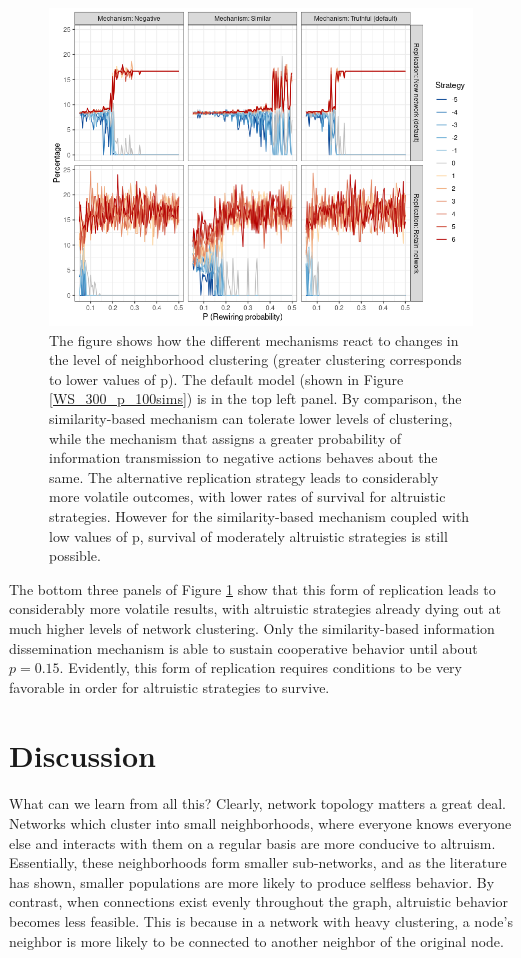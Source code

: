\documentclass{JASSS}
\begin{document}
\begin{figure}
	\centering
	\includegraphics[width=\linewidth]{./figures/results_vary_mechanisms.png}
	\caption{The figure shows how the different mechanisms react to changes in the level of neighborhood clustering (greater clustering corresponds to lower values of p). The default model (shown in Figure \ref{WS_300_p_100sims}) is in the top left panel. By comparison, the similarity-based mechanism can tolerate lower levels of clustering, while the mechanism that assigns a greater probability of information transmission to negative actions behaves about the same. The alternative replication strategy leads to considerably more volatile outcomes, with lower rates of survival for altruistic strategies. However for the similarity-based mechanism coupled with low values of p, survival of moderately altruistic strategies is still possible.}
	\label{vary_mechanisms}
\end{figure}

The bottom three panels of Figure \ref{vary_mechanisms} show that this form of replication leads to considerably more volatile results, with altruistic strategies already dying out at much higher levels of network clustering. Only the similarity-based information dissemination mechanism is able to sustain cooperative behavior until about $p=0.15$. Evidently, this form of replication requires conditions to be very favorable in order for altruistic strategies to survive.

\section{Discussion}
What can we learn from all this? Clearly, network topology matters a great deal. Networks which cluster into small neighborhoods, where everyone knows everyone else and interacts with them on a regular basis are more conducive to altruism. Essentially, these neighborhoods form smaller sub-networks, and as the literature has shown, smaller populations are more likely to produce selfless behavior. By contrast, when connections exist evenly throughout the graph, altruistic behavior becomes less feasible. This is because in a network with heavy clustering, a node's neighbor is more likely to be connected to another neighbor of the original node.
\end{document}
